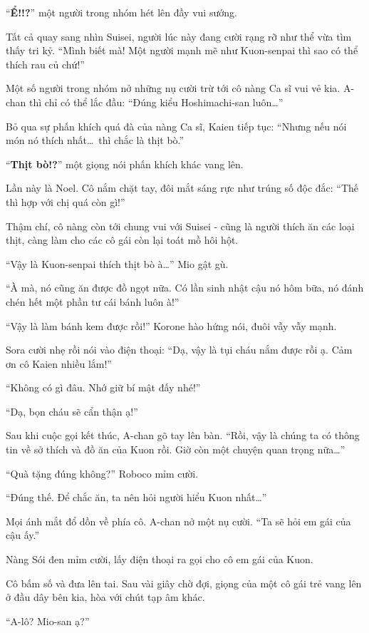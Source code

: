 \documentclass[../main.tex]{subfiles}
\begin{document}
``\textbf{Ể!!?}'' một người trong nhóm hét lên đầy vui sướng.

Tất cả quay sang nhìn Suisei, người lúc này đang cười rạng rỡ như thể vừa tìm thấy tri kỷ. ``Mình biết mà! Một người mạnh mẽ như Kuon-senpai thì sao có thể thích rau củ chứ!''

Một số người trong nhóm nở những nụ cười trừ tới cô nàng Ca sĩ vui vẻ kia. A-chan thì chỉ có thể lắc đầu: ``Đúng kiểu Hoshimachi-san luôn\dots''

Bỏ qua sự phấn khích quá đà của nàng Ca sĩ, Kaien tiếp tục: ``Nhưng nếu nói món nó thích nhất\dots\ thì chắc là thịt bò.''

``\textbf{Thịt bò!?}'' một giọng nói phấn khích khác vang lên.

Lần này là Noel. Cô nắm chặt tay, đôi mắt sáng rực như trúng số độc đắc: ``Thế thì hợp với chị quá còn gì!''

Thậm chí, cô nàng còn tới chung vui với Suisei - cũng là người thích ăn các loại thịt, càng làm cho các cô gái còn lại toát mồ hôi hột.

``Vậy là Kuon-senpai thích thịt bò à\dots'' Mio gật gù.

``À mà, nó cũng ăn được đồ ngọt nữa. Có lần sinh nhật cậu nó hôm bữa, nó đánh chén hết một phần tư cái bánh luôn à!''

``Vậy là làm bánh kem được rồi!'' Korone hào hứng nói, đuôi vẫy vẫy mạnh.

Sora cười nhẹ rồi nói vào điện thoại: ``Dạ, vậy là tụi cháu nắm được rồi ạ. Cảm ơn cô Kaien nhiều lắm!''

``Không có gì đâu. Nhớ giữ bí mật đấy nhé!''

``Dạ, bọn cháu sẽ cẩn thận ạ!''

Sau khi cuộc gọi kết thúc, A-chan gõ tay lên bàn. ``Rồi, vậy là chúng ta có thông tin về sở thích và đồ ăn của Kuon rồi. Giờ còn một chuyện quan trọng nữa\dots''

``Quà tặng đúng không?'' Roboco mỉm cười.

``Đúng thế. Để chắc ăn, ta nên hỏi người hiểu Kuon nhất\dots''

Mọi ánh mắt đổ dồn về phía cô. A-chan nở một nụ cười. ``Ta sẽ hỏi em gái của cậu ấy.''

Nàng Sói đen mỉm cười, lấy điện thoại ra gọi cho cô em gái của Kuon.

Cô bấm số và đưa lên tai. Sau vài giây chờ đợi, giọng của một cô gái trẻ vang lên ở đầu dây bên kia, hòa với chút tạp âm khác.

``A-lô? Mio-san ạ?''
\end{document}
